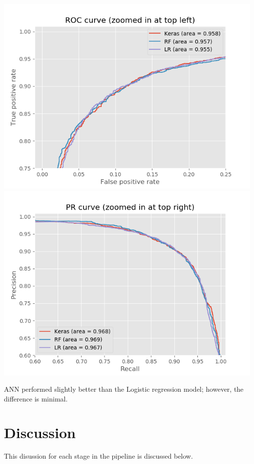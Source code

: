 \documentclass[letterpaper, 12 pt, conference]{ieeeconf}  %
\begin{document}
\begin{center}
        \includegraphics[scale=0.55]{../figures/ROC_zoom.png}
        \includegraphics[scale=0.55]{../figures/PR_zoom.png}
\end{center}

ANN performed slightly better than the Logistic regression model; however, the difference is minimal. 

\section{Discussion}

This disussion for each stage in the pipeline is discussed below.
\end{document}
